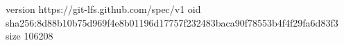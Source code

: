 version https://git-lfs.github.com/spec/v1
oid sha256:8d88b10b75d969f4e8b01196d17757f232483baca90f78553b4f4f29fa6d83f3
size 106208

